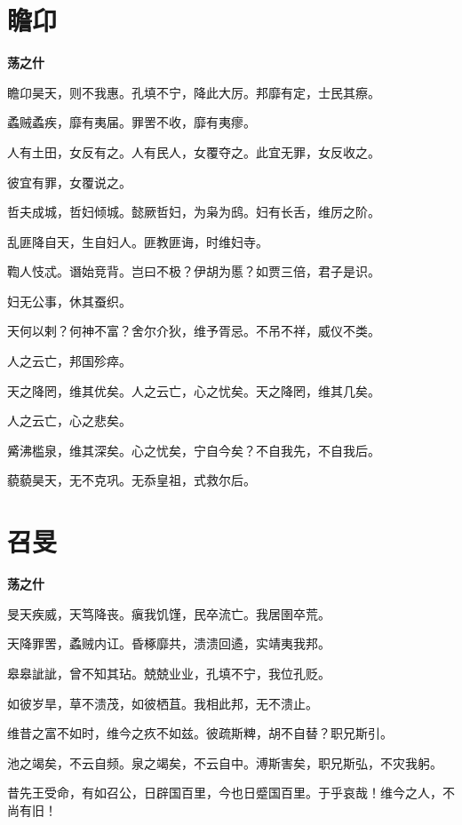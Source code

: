 \documentclass[12pt,a4paper]{ctexbook}
\begin{document}
\section{瞻卬}
\textbf{荡之什}\par\vspace{0.5em}
瞻卬昊天，则不我惠。孔填不宁，降此大厉。邦靡有定，士民其瘵。\par
蟊贼蟊疾，靡有夷届。罪罟不收，靡有夷瘳。\par
人有土田，女反有之。人有民人，女覆夺之。此宜无罪，女反收之。\par
彼宜有罪，女覆说之。\par
哲夫成城，哲妇倾城。懿厥哲妇，为枭为鸱。妇有长舌，维厉之阶。\par
乱匪降自天，生自妇人。匪教匪诲，时维妇寺。\par
鞫人忮忒。谮始竞背。岂曰不极？伊胡为慝？如贾三倍，君子是识。\par
妇无公事，休其蚕织。\par
天何以剌？何神不富？舍尔介狄，维予胥忌。不吊不祥，威仪不类。\par
人之云亡，邦国殄瘁。\par
天之降罔，维其优矣。人之云亡，心之忧矣。天之降罔，维其几矣。\par
人之云亡，心之悲矣。\par
觱沸槛泉，维其深矣。心之忧矣，宁自今矣？不自我先，不自我后。\par
藐藐昊天，无不克巩。无忝皇祖，式救尔后。\par

\section{召旻}
\textbf{荡之什}\par\vspace{0.5em}
旻天疾威，天笃降丧。瘨我饥馑，民卒流亡。我居圉卒荒。\par
天降罪罟，蟊贼内讧。昏椓靡共，溃溃回遹，实靖夷我邦。\par
皋皋訿訿，曾不知其玷。兢兢业业，孔填不宁，我位孔贬。\par
如彼岁旱，草不溃茂，如彼栖苴。我相此邦，无不溃止。\par
维昔之富不如时，维今之疚不如兹。彼疏斯粺，胡不自替？职兄斯引。\par
池之竭矣，不云自频。泉之竭矣，不云自中。溥斯害矣，职兄斯弘，不灾我躬。\par
昔先王受命，有如召公，日辟国百里，今也日蹙国百里。于乎哀哉！维今之人，不尚有旧！\par
\end{document}
